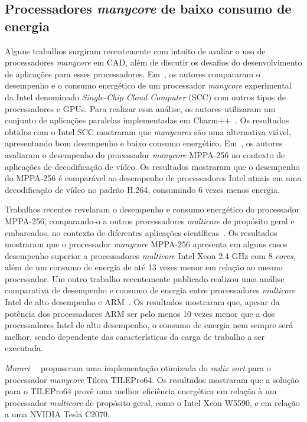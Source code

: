 \subsection{Processadores \textit{manycore} de baixo consumo de energia}
Alguns trabalhos surgiram recentemente com intuito de avaliar o uso de
processadores \emph{manycore} em CAD, além de discutir os desafios do
desenvolvimento de aplicações para esses processadores.
Em~\cite{SCCEnergy:2012}, os autores compararam o desempenho e o consumo
energético de um processador \emph{manycore} experimental da Intel denominado
\emph{Single-Chip Cloud Computer} (SCC) com outros tipos de processadores e
GPUs. Para realizar essa análise, os autores utilizaram um conjunto de
aplicações paralelas implementadas em Charm++~\cite{Charm:2012}. Os resultados
obtidos com o Intel SCC mostraram que \emph{manycores} são uma alternativa
viável, apresentando bom desempenho e baixo consumo energético.
Em~\cite{MPPA-1:2013}, os autores avaliaram o desempenho do processador
\emph{manycore} MPPA-256 no contexto de aplicações de decodificação de vídeo. Os
resultados mostraram que o desempenho do MPPA-256 é comparável ao desempenho de
processadores Intel atuais em uma decodificação de vídeo no padrão H.264,
consumindo 6 vezes menos energia.

Trabalhos recentes revelaram o desempenho e consumo energético do processador
MPPA-256, comparando-o a outros processadores \textit{multicore} de propósito
geral e embarcados, no contexto de diferentes aplicações
científicas~\cite{Castro-SBAC-PAD:2014,Castro-IA3:2013,Castro-IA3-JPDC:2014}. Os
resultados mostraram que o processador \emph{manycore} MPPA-256 apresenta em
alguns casos desempenho superior a processadores \emph{multicore} Intel Xeon 2.4
GHz com 8 \emph{cores}, além de um consumo de energia de até 13 vezes menor em
relação ao mesmo processador. Um outro trabalho recentemente publicado realizou
uma análise comparativa de desempenho e consumo de energia entre processadores
\emph{multicore} Intel de alto desempenho e ARM~\cite{Castro-Padoin-IET:2015}.
Os resultados mostraram que, apesar da potência dos processadores ARM ser pelo
menos 10 vezes menor que a dos processadores Intel de alto desempenho, o consumo
de energia nem sempre será melhor, sendo dependente das características da carga
de trabalho a ser executada.

\emph{Morari}~\etal~\cite{Valero:2012} propuseram uma implementação otimizada do
\textit{radix sort} para o processador \textit{manycore} Tilera TILEPro64. Os
resultados mostraram que a solução para o TILEPro64 provê uma melhor eficiência
energética em relação à um processador \textit{multicore} de propósito geral, como
o Intel Xeon W5590, e em relação a uma \gpu NVIDIA Tesla C2070.

